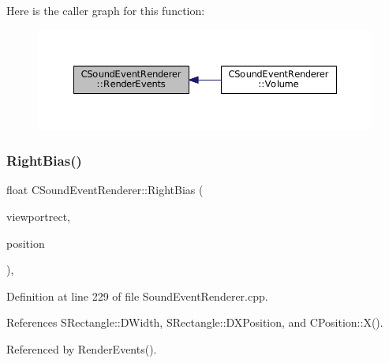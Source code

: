 Here is the caller graph for this function\+:\nopagebreak
\begin{figure}[H]
\begin{center}
\leavevmode
\includegraphics[width=350pt]{classCSoundEventRenderer_aa8b0c3029ea920ae4f4a08b9d9dd1c9c_icgraph}
\end{center}
\end{figure}
\hypertarget{classCSoundEventRenderer_a4be5ff09785c55c3b5b6966fb41eb47f}{}\label{classCSoundEventRenderer_a4be5ff09785c55c3b5b6966fb41eb47f} 
\subsubsection{\texorpdfstring{Right\+Bias()}{RightBias()}}
{\footnotesize\ttfamily float C\+Sound\+Event\+Renderer\+::\+Right\+Bias (\begin{DoxyParamCaption}\item[{const \hyperlink{structSRectangle}{S\+Rectangle} \&}]{viewportrect,  }\item[{const \hyperlink{classCPosition}{C\+Position} \&}]{position }\end{DoxyParamCaption})\hspace{0.3cm}{\ttfamily [static]}, {\ttfamily [protected]}}



Definition at line 229 of file Sound\+Event\+Renderer.\+cpp.



References S\+Rectangle\+::\+D\+Width, S\+Rectangle\+::\+D\+X\+Position, and C\+Position\+::\+X().



Referenced by Render\+Events().


